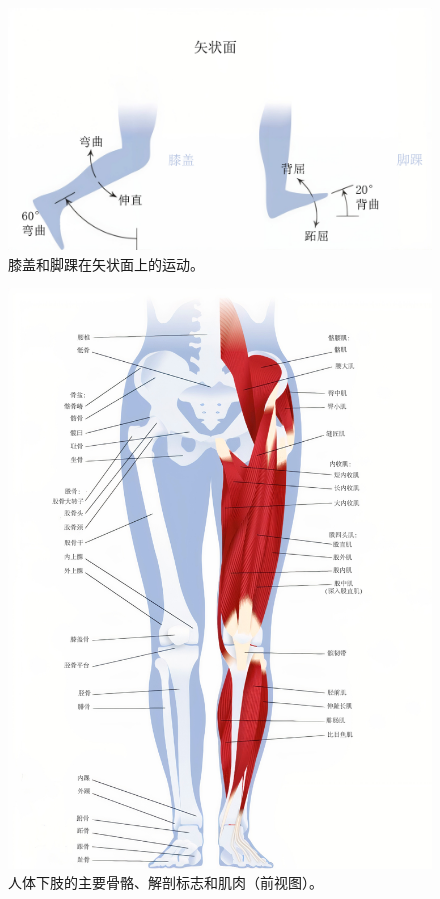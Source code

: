 \begin{figure}[!htb]
	\centering
	\includegraphics[width=0.75\linewidth]{chap1/1_17}
	\caption{膝盖和脚踝在矢状面上的运动。 \label{fig:1_17}}
\end{figure}


\begin{figure}[!htb]
	\centering
	\includegraphics[width=0.95\linewidth]{chap1/1_18}
	\caption{人体下肢的主要骨骼、解剖标志和肌肉（前视图）。 \label{fig:1_18}}
\end{figure}


